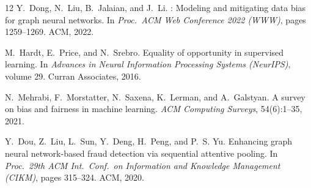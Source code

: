 \documentclass[sigconf,natbib=false]{acmart}
\begin{document}
\begin{thebibliography}{12}
Y.~Dong, N.~Liu, B.~Jalaian, and J.~Li.
: Modeling and mitigating data bias for graph neural networks.
\newblock In \textit{Proc.\ ACM Web Conference 2022 (WWW)}, pages 1259--1269. ACM, 2022.

M.~Hardt, E.~Price, and N.~Srebro.
\newblock Equality of opportunity in supervised learning.
\newblock In \textit{Advances in Neural Information Processing Systems (NeurIPS)}, volume 29. Curran Associates, 2016.

N.~Mehrabi, F.~Morstatter, N.~Saxena, K.~Lerman, and A.~Galstyan.
\newblock A survey on bias and fairness in machine learning.
\newblock \textit{ACM Computing Surveys}, 54(6):1--35, 2021.

Y.~Dou, Z.~Liu, L.~Sun, Y.~Deng, H.~Peng, and P.~S. Yu.
\newblock Enhancing graph neural network-based fraud detection via sequential attentive pooling.
\newblock In \textit{Proc.\ 29th ACM Int.\ Conf.\ on Information and Knowledge Management (CIKM)}, pages 315--324. ACM, 2020.

\end{thebibliography}
\end{document}
